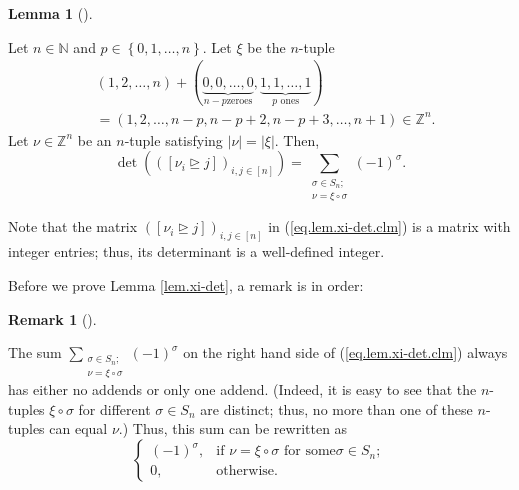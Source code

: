 \documentclass[numbers=enddot,12pt,final,onecolumn,notitlepage,english]{scrartcl}%
\theoremstyle{definition}
\newtheorem{lem}[theo]{Lemma}
\newenvironment{lemma}[1][]
{\begin{lem}[#1]\begin{leftbar}}
{\end{leftbar}\end{lem}}
\newtheorem{remk}[theo]{Remark}
\newenvironment{remark}[1][]
{\begin{remk}[#1]\begin{leftbar}}
{\end{leftbar}\end{remk}}
\let\sumnonlimits\sum
\renewcommand{\sum}{\sumnonlimits\limits}
\begin{document}
\begin{lemma}
\label{lem.xi-det}Let $n\in\mathbb{N}$ and $p\in\left\{  0,1,\ldots,n\right\}
$. Let $\xi$ be the $n$-tuple
\begin{align*}
&  \left(  1,2,\ldots,n\right)  +\left(  \underbrace{0,0,\ldots,0}_{n-p\text{
zeroes}},\underbrace{1,1,\ldots,1}_{p\text{ ones}}\right) \\
&  =\left(  1,2,\ldots,n-p,n-p+2,n-p+3,\ldots,n+1\right)  \in\mathbb{Z}^{n}.
\end{align*}
Let $\nu\in\mathbb{Z}^{n}$ be an $n$-tuple satisfying $\left\vert
\nu\right\vert =\left\vert \xi\right\vert $. Then,
\begin{equation}
\det\left(  \left(  \left[  \nu_{i}\trianglerighteq j\right]  \right)
_{i,j\in\left[  n\right]  }\right)  =\sum_{\substack{\sigma\in S_{n};\\\nu
=\xi\circ\sigma}}\left(  -1\right)  ^{\sigma}. \label{eq.lem.xi-det.clm}%
\end{equation}

\end{lemma}

Note that the matrix $\left(  \left[  \nu_{i}\trianglerighteq j\right]
\right)  _{i,j\in\left[  n\right]  }$ in (\ref{eq.lem.xi-det.clm}) is a matrix
with integer entries; thus, its determinant is a well-defined integer.

Before we prove Lemma \ref{lem.xi-det}, a remark is in order:

\begin{remark}
The sum $\sum_{\substack{\sigma\in S_{n};\\\nu=\xi\circ\sigma}}\left(
-1\right)  ^{\sigma}$ on the right hand side of (\ref{eq.lem.xi-det.clm})
always has either no addends or only one addend. (Indeed, it is easy to see
that the $n$-tuples $\xi\circ\sigma$ for different $\sigma\in S_{n}$ are
distinct; thus, no more than one of these $n$-tuples can equal $\nu$.) Thus,
this sum can be rewritten as
\[%
\begin{cases}
\left(  -1\right)  ^{\sigma}, & \text{if }\nu=\xi\circ\sigma\text{ for some
}\sigma\in S_{n};\\
0, & \text{otherwise.}%
\end{cases}
\]

\end{remark}
\end{document}
